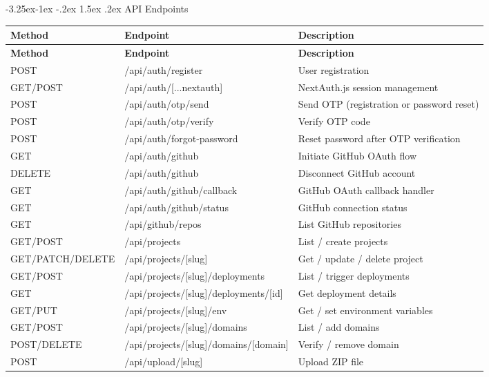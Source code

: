 \documentclass[12pt,a4paper]{article}
\makeatletter
\renewcommand\subsubsection{\@startsection{subsubsection}{3}{\z@}%
  {-3.25ex\@plus -1ex \@minus -.2ex}%
  {1.5ex \@plus .2ex}%
  {\normalfont\normalsize\bfseries}}
\makeatother
\begin{document}
\subsubsection{API Endpoints}
{\footnotesize
\begin{longtable}{|l|>{\ttfamily\raggedright\arraybackslash}p{6cm}|>{\raggedright\arraybackslash}p{3.5cm}|}
\hline
\textbf{Method} & \textbf{\textrm{Endpoint}} & \textbf{Description} \\
\hline
\endfirsthead
\hline
\textbf{Method} & \textbf{\textrm{Endpoint}} & \textbf{Description} \\
\hline
\endhead
POST & /api/auth/register & User registration \\
\hline
GET/POST & /api/auth/[...nextauth] & NextAuth.js session management \\
\hline
POST & /api/auth/otp/send & Send OTP (registration or password reset) \\
\hline
POST & /api/auth/otp/verify & Verify OTP code \\
\hline
POST & /api/auth/forgot-password & Reset password after OTP verification \\
\hline
GET & /api/auth/github & Initiate GitHub OAuth flow \\
\hline
DELETE & /api/auth/github & Disconnect GitHub account \\
\hline
GET & /api/auth/github/callback & GitHub OAuth callback handler \\
\hline
GET & /api/auth/github/status & GitHub connection status \\
\hline
GET & /api/github/repos & List GitHub repositories \\
\hline
GET/POST & /api/projects & List / create projects \\
\hline
GET/PATCH/DELETE & /api/projects/[slug] & Get / update / delete project \\
\hline
GET/POST & /api/projects/[slug]/deployments & List / trigger deployments \\
\hline
GET & /api/projects/[slug]/\allowbreak{}deployments/[id] & Get deployment details \\
\hline
GET/PUT & /api/projects/[slug]/env & Get / set environment variables \\
\hline
GET/POST & /api/projects/[slug]/domains & List / add domains \\
\hline
POST/DELETE & /api/projects/[slug]/\allowbreak{}domains/[domain] & Verify / remove domain \\
\hline
POST & /api/upload/[slug] & Upload ZIP file \\
\hline
\end{longtable}
}
\end{document}
